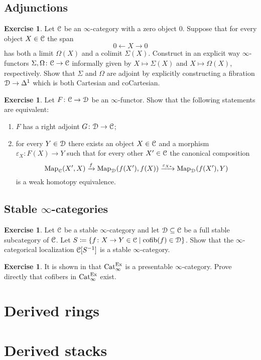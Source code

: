 \documentclass[10pt,a4paper,reqno,oneside]{book} %
\theoremstyle{plain}
\theoremstyle{definition}
\newtheorem{exercise}[thm]{Exercise}
\theoremstyle{remark}
\numberwithin{equation}{section}
\begin{document}
\section{Adjunctions}

\begin{exercise}
	Let $\mathcal C$ be an $\infty$-category with a zero object $0$.
	Suppose that for every object $X \in \mathcal C$ the span
	\[ 0 \longleftarrow X \longrightarrow 0 \]
	has both a limit $\Omega(X)$ and a colimit $\Sigma(X)$.
	Construct in an explicit way $\infty$-functors $\Sigma, \Omega \colon \mathcal C \to \mathcal C$ informally given by $X \mapsto \Sigma(X)$ and $X \mapsto \Omega(X)$, respectively.
	Show that $\Sigma$ and $\Omega$ are adjoint by explicitly constructing a fibration $\mathcal D \to \Delta^1$ which is both Cartesian and coCartesian.
\end{exercise}

\begin{exercise}
	Let $F \colon \mathcal C \to \mathcal D$ be an $\infty$-functor.
	Show that the following statements are equivalent:
	\begin{enumerate}
		\item $F$ has a right adjoint $G \colon \mathcal D \to \mathcal C$;
		\item for every $Y \in \mathcal D$ there exists an object $X \in \mathcal C$ and a morphism $\varepsilon_X \colon F(X) \to Y$ such that for every other $X' \in \mathcal C$ the canonical composition
		\[ \operatorname{Map}_{\mathcal C}(X',X) \xrightarrow{f} \operatorname{Map}_{\mathcal D}(f(X'), f(X)) \xrightarrow{\varepsilon_{X*}} \operatorname{Map}_{\mathcal D}(f(X'), Y) \]
		is a weak homotopy equivalence.
	\end{enumerate}
\end{exercise}

\section{Stable $\infty$-categories}

\begin{exercise}
	Let $\mathcal C$ be a stable $\infty$-category and let $\mathcal D \subseteq \mathcal C$ be a full stable subcategory of $\mathcal C$.
	Let $S \coloneqq \{f \colon X \to Y \in \mathcal C \mid \mathrm{cofib}(f) \in \mathcal D\}$.
	Show that the $\infty$-categorical localization $\mathcal C[S^{-1}]$ is a stable $\infty$-category.
\end{exercise}

\begin{exercise}
	It is shown in \cite{Blumberg_Gepner_Universal_2013} that $\mathrm{Cat}_\infty^{\mathrm{Ex}}$ is a presentable $\infty$-category.
	Prove directly that cofibers in $\mathrm{Cat}_\infty^{\mathrm{Ex}}$ exist.
\end{exercise}

\chapter{Derived rings}



\chapter{Derived stacks}





\end{document}
